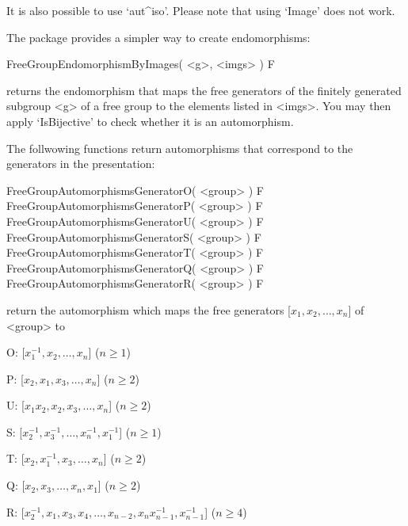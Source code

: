 It is also possible to use `aut^iso'.
Please note that using `Image' does not work.

The {\FGA} package provides a simpler way to create endomorphisms:

\>FreeGroupEndomorphismByImages( <g>, <imgs> ) F

returns the endomorphism that maps the free generators of the finitely
generated subgroup <g> of a free group to the elements listed in <imgs>.
You may then apply `IsBijective' to check whether it is an
automorphism.

The follwowing functions return automorphisms that correspond to the
generators in the presentation:

\>FreeGroupAutomorphismsGeneratorO( <group> ) F
\>FreeGroupAutomorphismsGeneratorP( <group> ) F
\>FreeGroupAutomorphismsGeneratorU( <group> ) F
\>FreeGroupAutomorphismsGeneratorS( <group> ) F
\>FreeGroupAutomorphismsGeneratorT( <group> ) F
\>FreeGroupAutomorphismsGeneratorQ( <group> ) F
\>FreeGroupAutomorphismsGeneratorR( <group> ) F

return the automorphism which maps the free generators 
[$ x_1, x_2, \dots, x_n $] of <group> to
\beginlist
  \item{O:} [$ x_1^{-1}, x_2, \dots, x_n $]                      ($n\ge1$)
  \item{P:} [$ x_2, x_1, x_3, \dots, x_n $]                      ($n\ge2$)
  \item{U:} [$ x_1x_2, x_2, x_3, \dots, x_n $]                   ($n\ge2$)
  \item{S:} [$ x_2^{-1}, x_3^{-1}, \dots, x_n^{-1}, x_1^{-1} $]  ($n\ge1$)
  \item{T:} [$ x_2, x_1^{-1}, x_3, \dots, x_n $]                 ($n\ge2$)
  \item{Q:} [$ x_2, x_3, \dots, x_n, x_1 $]                      ($n\ge2$)
  \item{R:} [$ x_2^{-1}, x_1, x_3, x_4, \dots,
             x_{n-2}, x_nx_{n-1}^{-1}, x_{n-1}^{-1} $]           ($n\ge4$)
\endlist



